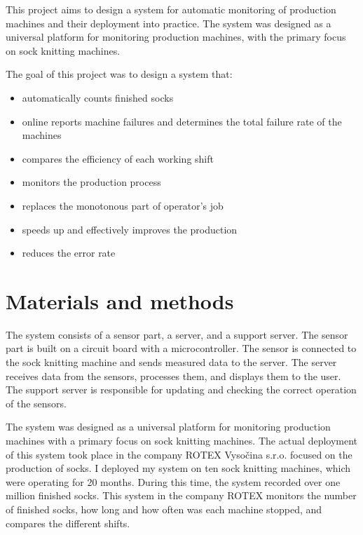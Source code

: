 \documentclass[12pt, a4paper]{article}
\begin{document}
This project aims to design a system for automatic monitoring of production machines and their deployment into practice.
The system was designed as a universal platform for monitoring production machines, with the primary focus on sock knitting machines.

The goal of this project was to design a system that:

\begin{itemize}
    \item automatically counts finished socks
    \item online reports machine failures and determines the total failure rate of the machines
    \item compares the efficiency of each working shift
    \item monitors the production process
    \item replaces the monotonous part of operator's job
    \item speeds up and effectively improves the production
    \item reduces the error rate
\end{itemize}


\section*{Materials and methods}

The system consists of a sensor part, a server, and a support server.
The sensor part is built on a circuit board with a microcontroller.
The sensor is connected to the sock knitting machine and sends measured data to the server.
The server receives data from the sensors, processes them, and displays them to the user.
The support server is responsible for updating and checking the correct operation of the sensors.

The system was designed as a universal platform for monitoring production machines with a primary focus on sock knitting machines.
The actual deployment of this system took place in the company ROTEX Vysočina s.r.o. focused on the production of socks.
I deployed my system on ten sock knitting machines, which were operating for 20 months.
During this time, the system recorded over one million finished socks.
This system in the company ROTEX monitors the number of finished socks, how long and how often was each machine stopped, and compares the different shifts.
\end{document}
